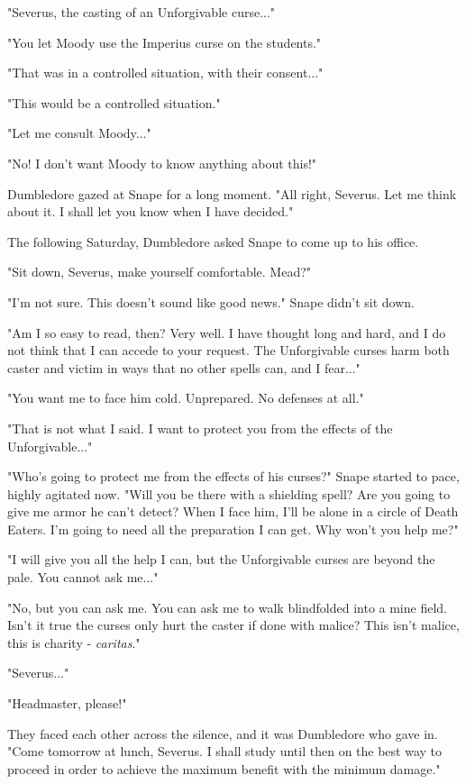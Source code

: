 \documentclass[a4paper,11pt]{article}
\begin{document}
"Severus, the casting of an Unforgivable curse..."

"You let Moody use the Imperius curse on the students."

"That was in a controlled situation, with their consent..."

"This would be a controlled situation."

"Let me consult Moody..."

"No! I don't want Moody to know anything about this!"

Dumbledore gazed at Snape for a long moment. "All right, Severus. Let me think about it. I shall let you know when I have decided."

The following Saturday, Dumbledore asked Snape to come up to his office.

"Sit down, Severus, make yourself comfortable. Mead?"

"I'm not sure. This doesn't sound like good news." Snape didn't sit down.

"Am I so easy to read, then? Very well. I have thought long and hard, and I do not think that I can accede to your request. The Unforgivable curses harm both caster and victim in ways that no other spells can, and I fear..."

"You want me to face him cold. Unprepared. No defenses at all."

"That is not what I said. I want to protect you from the effects of the Unforgivable..."

"Who's going to protect me from the effects of his curses?" Snape started to pace, highly agitated now. "Will you be there with a shielding spell? Are you going to give me armor he can't detect? When I face him, I'll be alone in a circle of Death Eaters. I'm going to need all the preparation I can get. Why won't you help me?"

"I will give you all the help I can, but the Unforgivable curses are beyond the pale. You cannot ask me..."

"No, but you can ask me. You can ask me to walk blindfolded into a mine field. Isn't it true the curses only hurt the caster if done with malice? This isn't malice, this is charity - \emph{caritas}."

"Severus..."

"Headmaster, please!"

They faced each other across the silence, and it was Dumbledore who gave in. "Come tomorrow at lunch, Severus. I shall study until then on the best way to proceed in order to achieve the maximum benefit with the minimum damage."
\end{document}
